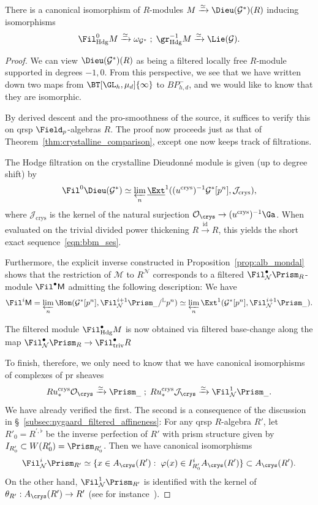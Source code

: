 \documentclass[10pt]{amsart}
\begin{document}
\begin{proposition}
\label{prop:de_rham_realization}
There is a canonical isomorphism of $R$-modules $M\xrightarrow{\simeq}\Dieu(\mathcal{G}^*)(R)$ inducing isomorphisms
\[
\Fil^0_{\mathrm{Hdg}}M\xrightarrow{\simeq}\omega_{\mathcal{G}^*}\;;\; \gr^{-1}_{\mathrm{Hdg}}M\xrightarrow{\simeq}\Lie(\mathcal{G}).
\]
\end{proposition} 
\begin{proof}
We can view $\Dieu(\mathcal{G}^*)(R)$ as being a filtered locally free $R$-module supported in degrees $-1,0$. From this perspective, we see that we have written down two maps from $\BT[\GL_h,\mu_d]{\infty}$ to $BP^-_{h,d}$, and we would like to know that they are isomorphic. 

By derived descent and the pro-smoothness of the source, it suffices to verify this on qrsp $\Field_p$-algebras $R$. The proof now proceeds just as that of Theorem~\ref{thm:crystalline_comparison}, except one now keeps track of filtrations.

The Hodge filtration on the crystalline Dieudonn\'e module is given (up to degree shift) by
\[
\Fil^0\Dieu(\mathcal{G}^*)\simeq \varprojlim_n\underline{\Ext}^1((u^{\mathrm{crys}})^{-1}\mathcal{G}^*[p^n],\mathcal{J}_{\mathrm{crys}}),
\]
where $\mathcal{J}_{\mathrm{crys}}$ is the kernel of the natural surjection $\mathcal{O}_{\crys}\to (u^{\mathrm{crys}})^{-1}\Ga$. When evaluated on the trivial divided power thickening $R\xrightarrow{\mathrm{id}}R$, this yields the short exact sequence~\eqref{eqn:bbm_ses}. 


Furthermore, the explicit inverse constructed in Proposition~\ref{prop:alb_mondal} shows that the restriction of $\mathcal{M}$ to $R^{\mathcal{N}}$ corresponds to a filtered $\Fil^\bullet_{\mathcal{N}}\Prism_R$-module $\Fil^\bullet \mathsf{M}$ admitting the following description: We have 
\[
\Fil^i\mathsf{M} = \varprojlim_n\Hom(\mathcal{G}^*[p^n],\Fil^{i+1}_{\mathcal{N}}\Prism_{\_}/{}^{\mathbb{L}}p^n)\simeq \varprojlim_n\Ext^1(\mathcal{G}^*[p^n],\Fil^{i+1}_{\mathcal{N}}\Prism_{\_}).
\]

The filtered module $\Fil^\bullet_{\mathrm{Hdg}}M$ is now obtained via filtered base-change along the map $\Fil^\bullet_{\mathcal{N}}\Prism_R\to \Fil^\bullet_{\mathrm{triv}}R$

To finish, therefore, we only need to know that we have canonical isomorphisms of complexes of pr sheaves
\[
Ru^{\mathrm{crys}}_* \mathcal{O}_{\crys}\xrightarrow{\simeq}\Prism_{\_}\;;\; Ru^{\mathrm{crys}}_*\mathcal{J}_{\crys} \xrightarrow{\simeq}\Fil^1_{\mathcal{N}}\Prism_{\_}.
\]
We have already verified the first. The second is a consequence of the discussion in \S~\ref{subsec:nygaard_filtered_affineness}: For any qrsp $R$-algebra $R'$, let $R'_0 = R^{',\flat}$ be the inverse perfection of $R'$ with prism structure given by $I_{R'_0}\subset W(R'_0) = \Prism_{R'_0}$. Then we have canonical isomorphisms
\[
\Fil^i_{\mathcal{N}}\Prism_{R'} \simeq \{x\in A_{\crys}(R'):\; \varphi(x)\in I_{R'_0}^iA_{\crys}(R')\}\subset A_{\crys}(R'). 
\]
On the other hand,  $\Fil^1_{\mathcal{N}}\Prism_{R'}$ is identified with the kernel of $\theta_{R'}:A_{\crys}(R')\to R'$ (see for instance~\cite[Proposition 5.3.6]{bhatt2022absolute}). 
\end{proof}
\end{document}
